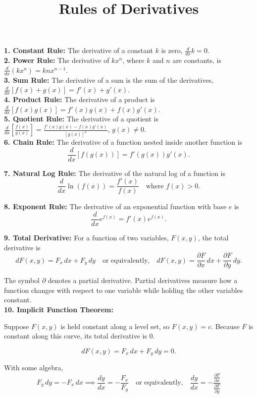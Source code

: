 \documentclass[12pt]{article}
\title{Rules of Derivatives}
\date{}
\begin{document}
\maketitle

\textbf{1. Constant Rule:} The derivative of a constant $k$ is zero, \(\frac{d}{dx}k = 0
\).\\

\textbf{2. Power Rule:} The derivative of $kx^n$, where $k$ and $n$ are constants, is \(
\frac{d}{dx}(kx^n) = knx^{n-1}
\).\\

\textbf{3. Sum Rule:} The derivative of a sum is the sum
of the derivatives, \(
\frac{d}{dx}[f(x)+g(x)]
= f'(x)+g'(x)
\).\\

\textbf{4. Product Rule:} The derivative of a product is
\(
\frac{d}{dx}[f(x)g(x)]
= f'(x)g(x)+f(x)g'(x)
\).\\

\textbf{5. Quotient Rule:} The derivative of a quotient is \(
\frac{d}{dx}
\left[\frac{f(x)}{g(x)}\right]
=
\frac{f'(x)g(x)-f(x)g'(x)}
{[g(x)]^2} \text{, } g(x) \neq 0
\).\\

\textbf{6. Chain Rule:} The derivative of a function nested inside another function is
\[
\frac{d}{dx}[f(g(x))]
=
f'(g(x))g'(x).
\]

\textbf{7. Natural Log Rule:} The derivative of the natural log of a function is
\[
\frac{d}{dx}\ln(f(x))
=
\frac{f'(x)}{f(x)} \quad \text{where } f(x) >0.
\]

\textbf{8. Exponent Rule:} The derivative of an exponential function with base $e$ is
\[
\frac{d}{dx}e^{f(x)}
=
f'(x)e^{f(x)}.
\]

\textbf{9. Total Derivative: } For a function of two variables, $F(x,y)$,
the total derivative is
\[
dF(x,y)
=
F_x\,dx+F_y\,dy \quad \text{or equivalently,} \quad 
dF(x,y)
=
\frac{\partial F}{\partial x}\,dx
+
\frac{\partial F}{\partial y}\,dy.
\]

The symbol $\partial$ denotes a
partial derivative. Partial derivatives measure how a function
changes with respect to one variable while holding the other variables constant.\\

\textbf{10. Implicit Function Theorem:} 

Suppose $F(x,y)$ is held constant along a level set, so $F(x,y)=c$. Because $F$ is constant along this curve,
its total derivative is 0.

\[
dF(x,y)=F_x\,dx+F_y\,dy=0.
\]

With some algebra,
\[
F_y\,dy=-F_x\,dx \implies 
\frac{dy}{dx}
=
-\frac{F_x}{F_y} \quad \text{or equivalently,} \quad 
\frac{dy}{dx}
=
-\frac{\frac{\partial F}{\partial x}}
{\frac{\partial F}{\partial y}}
\]
\end{document}

